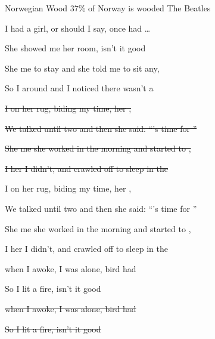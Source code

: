 \begin{SBSong}{Norwegian Wood}
  {37\% of Norway is wooded}
  {The Beatles}
  \begin{SBVerse}
    I  had a girl, or should I say,  once had \ldots
    
    She showed me her room, isn't it good  
    
    She  me to stay and she told me to sit any,
    
    So I  around and I noticed there wasn't a  
  \end{SBVerse}
  \begin{SBVerse}
    \sout{I  on her rug, biding my time,  her ,} 
    
    \sout{We talked until two and then she said: ``'s time for ''}
    
    \sout{She  me she worked in the morning and started to ,}
    
    \sout{I  her I didn't, and crawled off to sleep in the  }
  \end{SBVerse}
  \begin{SBVerse}
    I  on her rug, biding my time,  her , 
    
    We talked until two and then she said: ``'s time for ''
    
    She  me she worked in the morning and started to ,
    
    I  her I didn't, and crawled off to sleep in the  
  \end{SBVerse}
  \begin{SBVerse}
     when I awoke, I was alone,  bird had 
    
    So I lit a fire, isn't it good  
    
    
    \sout{ when I awoke, I was alone,  bird had }
    
    \sout{So I lit a fire, isn't it good  }
  \end{SBVerse}
\end{SBSong}
